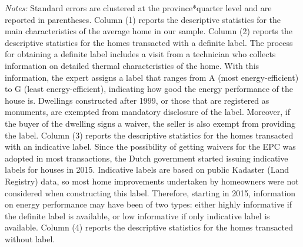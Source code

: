 \documentclass[12pt]{article}
\begin{document}
\begin{table}[H]
\begin{tabular}{lcccc}
    \end{tabular}%
\begin{tablenotes}
\scriptsize
\item \textit{Notes:} Standard errors are clustered at the province*quarter level and are reported in parentheses. Column (1) reports the descriptive statistics for the main characteristics of the average home in our sample. Column (2) reports the descriptive statistics for the homes transacted with a definite label. The process for obtaining a definite label includes a visit from a technician who collects information on detailed thermal characteristics of the home. With this information, the expert assigns a label that ranges from A (most energy-efficient) to G (least energy-efficient), indicating how good the energy performance of the house is. Dwellings constructed after 1999, or those that are registered as monuments, are exempted from mandatory disclosure of the label. Moreover, if the buyer of the dwelling signs a waiver, the seller is also exempt from providing the label. Column (3) reports the descriptive statistics for the homes transacted with an indicative label. Since the possibility of getting waivers for the EPC was adopted in most transactions, the Dutch government started issuing indicative labels for houses in 2015. Indicative labels are based on public Kadaster (Land Registry) data, so most home improvements undertaken by homeowners were not considered when constructing this label. Therefore, starting in 2015, information on energy performance may have been of two types: either highly informative if the definite label is available, or low informative if only indicative label is available. Column (4) reports the descriptive statistics for the homes transacted without label.
\end{tablenotes}

  \label{tab:addlabel}%
\end{table}%
\end{document}
